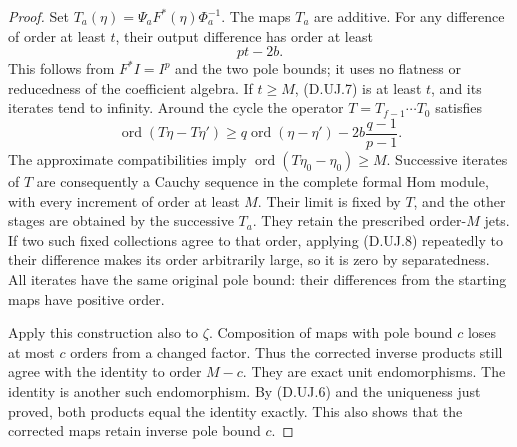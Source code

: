 \begin{proof}
Set
$T_a(\eta)=\Psi_aF^*(\eta)\Phi_a^{-1}$.
The maps $T_a$ are additive. For any difference of order at
least $t$, their output difference has order at least
\[
                              pt-2b.                    \tag{D.UJ.7}
\]
This follows from $F^*I=I^p$ and the two pole bounds; it
uses no flatness or reducedness of the coefficient algebra.
If $t\geq M$, (D.UJ.7) is at least $t$, and its iterates
tend to infinity. Around the cycle the operator
$T=T_{f-1}\cdots T_0$ satisfies
\[
 \operatorname{ord}(T\eta-T\eta')
       \geq q\operatorname{ord}(\eta-\eta')
                         -2b\frac{q-1}{p-1}.           \tag{D.UJ.8}
\]
The approximate compatibilities imply
$\operatorname{ord}(T\eta_0-\eta_0)\geq M$.
Successive iterates of $T$ are consequently a Cauchy
sequence in the complete formal Hom module, with every
increment of order at least $M$. Their limit is fixed by
$T$, and the other stages are obtained by the successive
$T_a$. They retain the prescribed order-$M$ jets. If two
such fixed collections agree to that order, applying
(D.UJ.8) repeatedly to their difference makes its order
arbitrarily large, so it is zero by separatedness.
All iterates have the same original pole bound: their
differences from the starting maps have positive order.

Apply this construction also to $\zeta$. Composition of
maps with pole bound $c$ loses at most $c$ orders from a
changed factor. Thus the corrected inverse products still
agree with the identity to order $M-c$. They are exact
unit endomorphisms. The identity is another such
endomorphism. By (D.UJ.6) and the uniqueness just proved,
both products equal the identity exactly. This also shows
that the corrected maps retain inverse pole bound $c$.
\end{proof}

